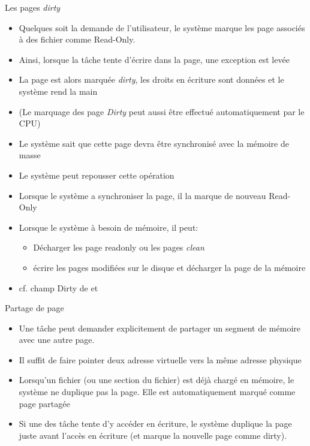 \begin{frame}[fragile=singleslide]{Les pages \emph{dirty}}
  \begin{itemize}
  \item Quelques  soit la demande de l'utilisateur,  le système marque
    les page associés à des fichier comme Read-Only.
  \item  Ainsi, lorsque  la tâche  tente  d'écrire dans  la page,  une
    exception est levée
  \item  La  page est  alors  marquée  \emph{dirty}, les  droits  en
    écriture sont données et le système rend la main
  \item (Le  marquage des page  \emph{Dirty} peut aussi  être effectué
    automatiquement par le CPU)
  \item Le système sait que  cette page devra être synchronisé avec la
    mémoire de masse
  \item Le système peut repousser cette opération
  \item Lorsque  le système  a synchroniser la  page, il la  marque de
    nouveau Read-Only
  \item Lorsque  le système  à besoin de  mémoire, il peut:
    \begin{itemize}
    \item Décharger les page readonly ou les pages \emph{clean}
    \item écrire  les pages  modifiées sur le  disque et  décharger la
      page de la mémoire
    \end{itemize}
  \item cf. champ Dirty de  et 
  \end{itemize}
\end{frame}

\begin{frame}[fragile=singleslide]{Partage de page}
  \begin{itemize}
  \item Une  tâche peut demander explicitement de  partager un segment
    de mémoire avec une autre page.
  \item Il  suffit de  faire pointer deux  adresse virtuelle  vers la
    même adresse physique
  \item Lorsqu'un fichier (ou une  section du fichier) est déjà chargé
    en  mémoire,  le  système  ne  duplique  pas  la  page.  Elle  est
    automatiquement marqué comme page partagée
  \item Si  une des  tâche tente d'y  accéder en écriture,  le système
    duplique la  page juste  avant l'accès en  écriture (et  marque la
    nouvelle page comme dirty).
  \end{itemize}
\end{frame}

